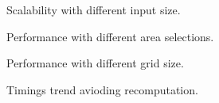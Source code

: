 \documentclass{sig-alternate-05-2015}
\begin{document}
\begin{figure}[t]
  \caption{Scalability with different input size.}
  \label{scalability}
\end{figure}
\begin{figure}[t]
  \caption{Performance with different area selections.}
  \label{square}
\end{figure}
\begin{figure}[t]
  \caption{Performance with different grid size.}
  \label{step}
\end{figure}
\begin{figure}[t]
  \caption{Timings trend avioding recomputation.}
  \label{recomputation}
\end{figure}
\end{document}
